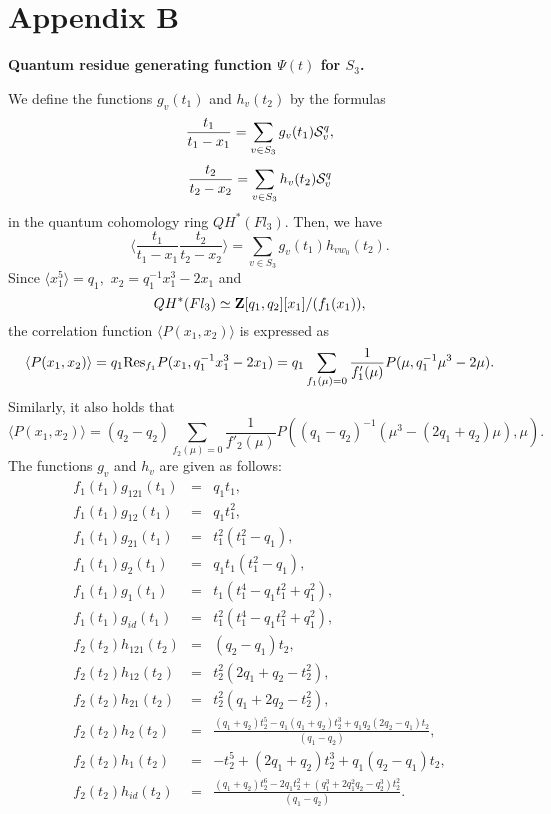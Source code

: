 {{%
\section*{Appendix B}
{\large{\bf Quantum residue generating function $\Psi (t)$ for $S_3$.}}

\vskip 0.5cm
We define the functions 
$g_{v}(t_1)$ and $h_{v}(t_2)$ by the formulas 
\[ \frac{t_1}{t_1-x_1} = \sum_{v\in S_3}
g_{v}(t_1){\cal S}^q_v, \]
\[ \frac{t_2}{t_2-x_2} = \sum_{v\in S_3} 
h_{v}(t_2){\cal S}^q_v \] 
in the quantum cohomology ring $QH^{\ast}(Fl_3).$
Then, we have 
\[ \langle \frac{t_1}{t_1 - x_1} 
\frac{t_2}{t_2 - x_2} \rangle 
= \sum_{v\in S_3} g_v (t_1) h_{vw_0} (t_2). \] 
Since $\langle x_1^5 \rangle = q_1,$ 
$x_2 = q_1^{-1} x_1^3 - 2x_1$ and 
\[ QH^{\ast}(Fl_3) \simeq {\bf Z}[q_1, q_2][x_1]/(f_1(x_1)), \] 
the correlation function $\langle P(x_1,x_2) \rangle $ is 
expressed as 
$$\langle P(x_1,x_2) \rangle  =  
q_1 {\rm Res}_{f_1} P(x_1,q_1^{-1}x_1^3-2x_1) 
= q_1 \sum_{f_1(\mu)=0}\frac{1}{f'_1(\mu)}
P(\mu,q_1^{-1}\mu^3-2\mu) .
$$
Similarly, it also holds that 
\[ \langle P(x_1,x_2) \rangle = 
(q_2-q_2) \sum_{f_2(\mu)=0} 
\frac{1}{f'_2(\mu)} P((q_1-q_2)^{-1}(\mu^3-(2q_1+ q_2)\mu),
\mu). \] 
The functions $g_v$ and $h_v$ are given as follows: 
\begin{eqnarray*} 
f_1(t_1) g_{121}(t_1) & = & q_1t_1, \\ 
f_1(t_1) g_{12}(t_1) & = & q_1t_1^2, \\  
f_1(t_1) g_{21}(t_1) & = & t_1^2(t_1^2-q_1), \\ 
f_1(t_1) g_{2}(t_1) & = & q_1t_1(t_1^2-q_1), \\ 
f_1(t_1) g_1(t_1) & = & t_1(t_1^4-q_1t_1^2+q_1^2), \\ 
f_1(t_1) g_{id}(t_1) & = &  t_1^2(t_1^4-q_1t_1^2+q_1^2), \\ 
f_2(t_2) h_{121}(t_2) & = & (q_2-q_1)t_2, \\ 
f_2(t_2) h_{12}(t_2) & = & t_2^2(2q_1+q_2-t_2^2), \\
f_2(t_2) h_{21}(t_2) & = & t_2^2(q_1+2q_2-t_2^2), \\ 
f_2(t_2) h_2(t_2) & = &  \frac{(q_1+q_2)t_2^5-q_1(q_1+q_2)t_2^3+q_1q_2(2q_2-q_1)t_2}
{(q_1-q_2)}, \\ 
f_2(t_2) h_1(t_2) & = & 
-t_2^5+(2q_1+q_2)t_2^3+q_1(q_2-q_1)t_2, \\ 
f_2(t_2) h_{id}(t_2) & = & \frac{(q_1+q_2)t_2^6-2q_1t_2^2+
(q_1^3+2q_1^2q_2-q_2^3)t_2^2}{(q_1-q_2)}. 

\end{eqnarray*}}}
